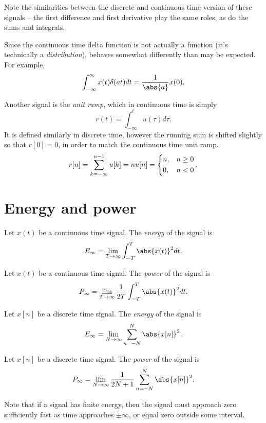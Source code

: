 \documentclass[12pt]{article}
\begin{document}
Note the similarities between the discrete and continuous time version of these signals -- the first difference and first derivative play the same roles, as do the sums and integrals.

Since the continuous time delta function is not actually a function (it's technically a \emph{distribution}), behaves somewhat differently than may be expected. For example, \[\int_{-\infty}^{\infty}x(t)\delta(at)dt = \frac{1}{\abs{a}}x(0).\]

Another signal is the \emph{unit ramp}, which in continuous time is simply \[r(t) = \int_{-\infty}^{t}u(\tau)d\tau.\] It is defined similarly in discrete time, however the running sum is shifted slightly so that $r[0] = 0$, in order to match the continuous time unit ramp. \[r[n] = \sum_{k=-\infty}^{n-1}u[k]= nu[n] = \begin{dcases}
    n, & n \geq 0 \\ 0, & n < 0
\end{dcases}.\]

\section{Energy and power}

\begin{defn}
    Let $x(t)$ be a continuous time signal. The \emph{energy} of the signal is
    \[E_{\infty} = \lim_{T\to\infty}\int_{-T}^{T}\abs{x(t)}^2dt.\]
\end{defn}

\begin{defn}
    Let $x(t)$ be a continuous time signal. The \emph{power} of the signal is
    \[P_{\infty} = \lim_{T \to \infty}\frac{1}{2T}\int_{-T}^T\abs{x(t)}^2dt.\]
\end{defn}

\begin{defn}
    Let $x[n]$ be a discrete time signal. The \emph{energy} of the signal is
    \[E_{\infty} = \lim_{N\to\infty}\sum_{n=-N}^{N}\abs{x[n]}^2.\]
\end{defn}

\begin{defn}
    Let $x[n]$ be a discrete time signal. The \emph{power} of the signal is
    \[P_{\infty} = \lim_{N \to \infty}\frac{1}{2N+1}\sum_{n=-N}^N\abs{x[n]}^2.\]
\end{defn}

Note that if a signal has finite energy, then the signal must approach zero sufficiently fast as time approaches $\pm\infty$, or equal zero outside some interval.
\end{document}
